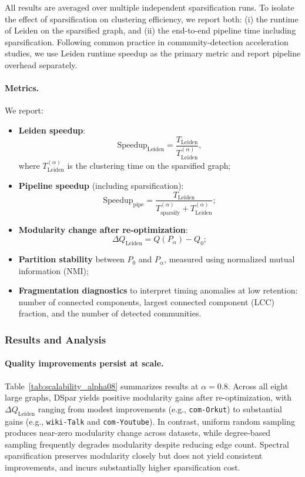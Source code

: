 \documentclass[10pt,journal,compsoc]{IEEEtran}
\begin{document}
All results are averaged over multiple independent sparsification runs.
To isolate the effect of sparsification on clustering efficiency, we report both:
(i) the runtime of Leiden on the sparsified graph, and
(ii) the end-to-end pipeline time including sparsification.
Following common practice in community-detection acceleration studies, we use Leiden runtime speedup as the primary metric and report pipeline overhead separately.

\paragraph{Metrics.}
We report:
\begin{itemize}
  \item \textbf{Leiden speedup}:
  \[
  \mathrm{Speedup}_{\mathrm{Leiden}} =
  \frac{T_{\mathrm{Leiden}}}{T_{\mathrm{Leiden}}^{(\alpha)}},
  \]
  where $T_{\mathrm{Leiden}}^{(\alpha)}$ is the clustering time on the sparsified graph;
  \item \textbf{Pipeline speedup} (including sparsification):
  \[
  \mathrm{Speedup}_{\mathrm{pipe}} =
  \frac{T_{\mathrm{Leiden}}}{T_{\mathrm{sparsify}}^{(\alpha)} + T_{\mathrm{Leiden}}^{(\alpha)}};
  \]
  \item \textbf{Modularity change after re-optimization}:
  \[
  \Delta Q_{\mathrm{Leiden}} = Q(P_\alpha) - Q_0;
  \]
  \item \textbf{Partition stability} between $P_0$ and $P_\alpha$, measured using normalized mutual information (NMI);
  \item \textbf{Fragmentation diagnostics} to interpret timing anomalies at low retention:
  number of connected components, largest connected component (LCC) fraction, and the number of detected communities.
\end{itemize}

\subsubsection{Results and Analysis}

\paragraph{Quality improvements persist at scale.}
Table~\ref{tab:scalability_alpha08} summarizes results at $\alpha=0.8$.
Across all eight large graphs, DSpar yields positive modularity gains after re-optimization, with $\Delta Q_{\mathrm{Leiden}}$ ranging from modest improvements (e.g., \texttt{com-Orkut}) to substantial gains (e.g., \texttt{wiki-Talk} and \texttt{com-Youtube}).
In contrast, uniform random sampling produces near-zero modularity change across datasets, while degree-based sampling frequently degrades modularity despite reducing edge count.
Spectral sparsification preserves modularity closely but does not yield consistent improvements, and incurs substantially higher sparsification cost.
\end{document}
